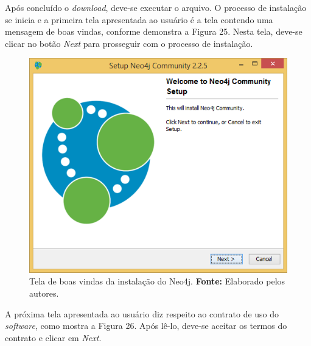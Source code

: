 \par Após concluído o \textit{download}, deve-se executar o arquivo. O processo de instalação se inicia e a primeira tela apresentada ao usuário é a tela contendo uma mensagem de boas vindas, conforme demonstra a Figura 25. Nesta tela, deve-se clicar no botão \textit{Next} para prosseguir com o processo de instalação.

\begin{figure}[h!]
	\centerline{\includegraphics[scale=0.4]{./imagens/neo4j-install-step1.png}}
	\caption[Tela de boas vindas da instalação do Neo4j]
	{Tela de boas vindas da instalação do Neo4j. \textbf{Fonte:} Elaborado pelos autores.}
	\label{fig:exemplo1}
\end{figure}

\par A próxima tela apresentada ao usuário diz respeito ao contrato de uso do \textit{software}, como mostra a Figura 26. Após lê-lo, deve-se aceitar os termos do contrato e clicar em \textit{Next}.

